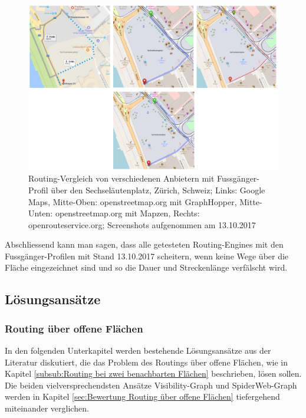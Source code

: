 \begin{figure}[ht]
\centering
\includegraphics[width=1\linewidth]{technicalreport/img/sechselaeutenplatz_comparison}
\caption[Fussgänger-Routing Vergleich]{Routing-Vergleich von verschiedenen Anbietern mit Fussgänger-Profil über den Sechseläutenplatz, Zürich, Schweiz; Links: Google Maps, Mitte-Oben: openstreetmap.org mit GraphHopper, Mitte-Unten: openstreetmap.org mit Mapzen, Rechts: openrouteservice.org; Screenshots aufgenommen am 13.10.2017}
\label{fig:sechselaeutenplatz_comparison}
\end{figure}


Abschliessend kann man sagen, dass alle getesteten Routing-Engines mit den Fussgänger-Profilen mit Stand 13.10.2017 scheitern, wenn keine Wege über die Fläche eingezeichnet sind und so die Dauer und Streckenlänge verfälscht wird.

\subsection{Lösungsansätze}
\label{sub:Lösungsansätze}


\subsubsection{Routing über offene Flächen}
\label{solution:Routing über offene Flächen}

In den folgenden Unterkapitel werden bestehende Lösungsansätze aus der Literatur diskutiert, die das Problem des Routings über offene Flächen, wie in Kapitel \ref{subsub:Routing bei zwei benachbarten Flächen} beschrieben, lösen sollen. Die beiden vielversprechendsten Ansätze Visibility-Graph und SpiderWeb-Graph werden in Kapitel \ref{sec:Bewertung Routing über offene Flächen} tiefergehend miteinander verglichen.

